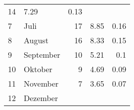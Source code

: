 \begin{longtable}{lXrrr}
       \num{14} &
       \num[round-mode=places,round-precision=2]{7,29} &
         \num[round-mode=places,round-precision=2]{0,13} \\

     7 &
     \multicolumn{1}{X}{ Juli   } &


       \num{17} &
       \num[round-mode=places,round-precision=2]{8,85} &
         \num[round-mode=places,round-precision=2]{0,16} \\

     8 &
     \multicolumn{1}{X}{ August   } &


       \num{16} &
       \num[round-mode=places,round-precision=2]{8,33} &
         \num[round-mode=places,round-precision=2]{0,15} \\

     9 &
     \multicolumn{1}{X}{ September   } &


       \num{10} &
       \num[round-mode=places,round-precision=2]{5,21} &
         \num[round-mode=places,round-precision=2]{0,1} \\

     10 &
     \multicolumn{1}{X}{ Oktober   } &


       \num{9} &
       \num[round-mode=places,round-precision=2]{4,69} &
         \num[round-mode=places,round-precision=2]{0,09} \\

     11 &
     \multicolumn{1}{X}{ November   } &


       \num{7} &
       \num[round-mode=places,round-precision=2]{3,65} &
         \num[round-mode=places,round-precision=2]{0,07} \\

     12 &
     \multicolumn{1}{X}{ Dezember   } &



\end{longtable}
